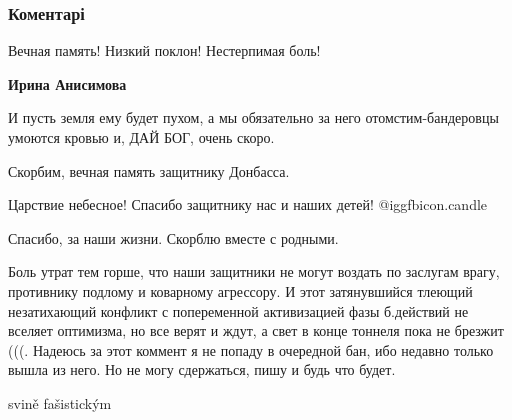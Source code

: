  
 
 
 
 
\subsubsection{Коментарі}

Вечная память! Низкий поклон! Нестерпимая боль!

\textbf{Ирина Анисимова} 

И пусть земля ему будет пухом, а мы обязательно за него отомстим-бандеровцы
умоются кровью и, ДАЙ БОГ, очень скоро.

Скорбим, вечная память защитнику Донбасса.

Царствие небесное! Спасибо защитнику нас и наших детей!  @igg{fbicon.candle} 

Спасибо, за наши жизни. Скорблю вместе с родными.


Боль утрат тем горше, что наши защитники не могут воздать по заслугам врагу,
противнику подлому и коварному агрессору. И этот затянувшийся тлеющий
незатихающий конфликт с попеременной активизацией фазы б.действий не вселяет
оптимизма, но все верят и ждут, а свет в конце тоннеля пока не брезжит (((.
Надеюсь за этот коммент я не попаду в очередной бан, ибо недавно только вышла
из него. Но не могу сдержаться, пишу и будь что будет.

svině fašistickým
